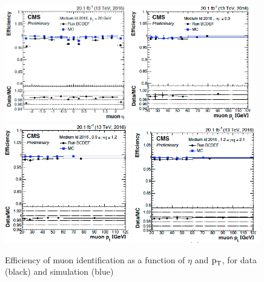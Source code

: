 \begin{figure}[!htpb]\centering
 \includegraphics[width=0.47\textwidth]{plots_and_figures/chapter4/muoneffveta.png}
 \includegraphics[width=0.49\textwidth]{plots_and_figures/chapter4/muoneffvpt1.png} \\
 \includegraphics[width=0.49\textwidth]{plots_and_figures/chapter4/muoneffvpt2.png}
 \includegraphics[width=0.49\textwidth]{plots_and_figures/chapter4/muoneffvpt3.png} 
\caption{Efficiency of muon identification as a function of $\eta$ and $\text{p}_\text{T}$, for data (black) and simulation (blue)}
 \label{fig:muoneff}
\end{figure}  
  

